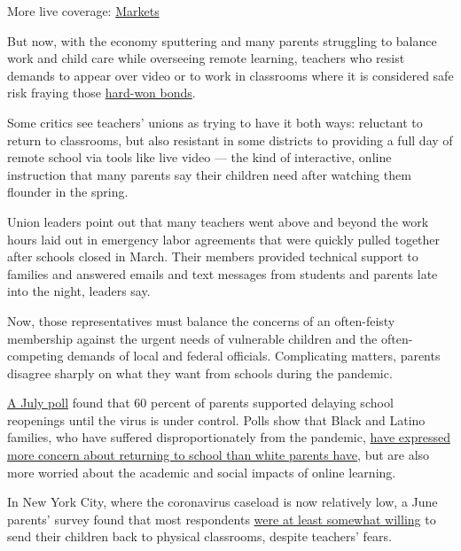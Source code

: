 More live coverage:
\href{https://www.nytimes.com/live/2020/07/31/business/stock-market-today-coronavirus?action=click\&pgtype=Article\&state=default\&region=MAIN_CONTENT_1\&context=storylines_live_updates}{Markets}

But now, with the economy sputtering and many parents struggling to
balance work and child care while overseeing remote learning, teachers
who resist demands to appear over video or to work in classrooms where
it is considered safe risk fraying those
\href{https://www.nytimes.com/2020/07/11/us/virus-teachers-classrooms.html}{hard-won
bonds}.

Some critics see teachers' unions as trying to have it both ways:
reluctant to return to classrooms, but also resistant in some districts
to providing a full day of remote school via tools like live video ---
the kind of interactive, online instruction that many parents say their
children need after watching them flounder in the spring.

Union leaders point out that many teachers went above and beyond the
work hours laid out in emergency labor agreements that were quickly
pulled together after schools closed in March. Their members provided
technical support to families and answered emails and text messages from
students and parents late into the night, leaders say.

Now, those representatives must balance the concerns of an often-feisty
membership against the urgent needs of vulnerable children and the
often-competing demands of local and federal officials. Complicating
matters, parents disagree sharply on what they want from schools during
the pandemic.

\href{https://www.kff.org/coronavirus-covid-19/report/kff-health-tracking-poll-july-2020/}{A
July poll} found that 60 percent of parents supported delaying school
reopenings until the virus is under control. Polls show that Black and
Latino families, who have suffered disproportionately from the pandemic,
\href{https://www.chalkbeat.org/2020/7/14/21324873/school-closure-reopening-parents-surveys}{have
expressed more concern about returning to school than white parents
have}, but are also more worried about the academic and social impacts
of online learning.

In New York City, where the coronavirus caseload is now relatively low,
a June parents' survey found that most respondents
\href{https://www.nytimes.com/2020/07/06/nyregion/nyc-school-reopening-plan.html}{were
at least somewhat willing} to send their children back to physical
classrooms, despite teachers' fears.

